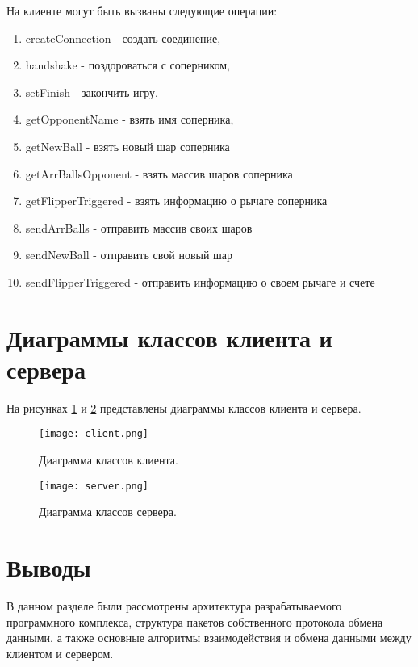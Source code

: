 На клиенте могут быть вызваны следующие операции:
\begin{enumerate}
\item createConnection - создать соединение,
\item handshake - поздороваться с соперником,
\item setFinish - закончить игру,
\item getOpponentName - взять имя соперника,
\item getNewBall - взять новый шар соперника
\item getArrBallsOpponent - взять массив шаров соперника
\item getFlipperTriggered - взять информацию о рычаге соперника
\item sendArrBalls  - отправить массив своих шаров
\item sendNewBall - отправить свой новый шар
\item sendFlipperTriggered - отправить информацию о своем рычаге и счете
\end{enumerate}

\section{Диаграммы классов клиента и сервера}

На рисунках \ref{image:diag-client} и \ref{image:diag-server} представлены диаграммы классов клиента и сервера.

\begin{figure}[h]
  \centering
  \texttt{[image: client.png]}
  \caption{Диаграмма классов клиента.}
  \label{image:diag-client}
\end{figure}

\begin{figure}[h]
  \centering
  \texttt{[image: server.png]}
  \caption{Диаграмма классов сервера.}
  \label{image:diag-server}
\end{figure}

\section{Выводы}
В данном разделе были рассмотрены архитектура разрабатываемого программного комплекса, структура пакетов собственного протокола обмена данными, а также основные алгоритмы взаимодействия и обмена данными между клиентом и сервером.